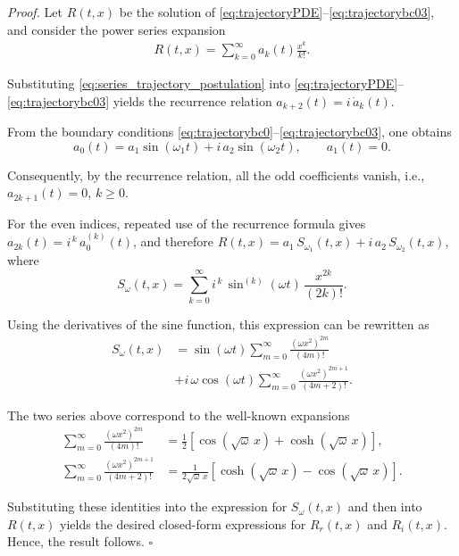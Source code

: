 \documentclass[letterpaper, 10 pt, conference]{ieeeconf}  %
\newenvironment{pf}
{\noindent\textit{Proof.}\hspace{1.2mm}}
{\hspace{\fill}$\square$}
\begin{document}
\begin{pf}
Let $R(t,x)$ be the solution of \eqref{eq:trajectoryPDE}--\eqref{eq:trajectorybc03}, and consider the power series expansion
\begin{align}
    R(t,x) = \sum_{k=0}^{\infty} a_{k}(t)\frac{x^{k}}{k!}.
    \label{eq:series_trajectory_postulation}
\end{align}

Substituting \eqref{eq:series_trajectory_postulation} into \eqref{eq:trajectoryPDE}--\eqref{eq:trajectorybc03} yields the recurrence relation $a_{k+2}(t) = i\,\dot{a}_{k}(t)$.

From the boundary conditions \eqref{eq:trajectorybc0}--\eqref{eq:trajectorybc03}, one obtains
\begin{equation*}
    a_{0}(t) = a_{1}\sin(\omega_{1}t) + i\,a_{2}\sin(\omega_{2}t),
    \qquad 
    a_{1}(t) = 0.
\end{equation*}

Consequently, by the recurrence relation, all the odd coefficients vanish, i.e., $a_{2k+1}(t) = 0$,  $k \ge 0$.

For the even indices, repeated use of the recurrence formula gives $a_{2k}(t) = i^{\,k}\,a_{0}^{(k)}(t)$, and therefore
$R(t,x) = a_{1}\,S_{\omega_{1}}(t,x) + i\,a_{2}\,S_{\omega_{2}}(t,x)$,
where
\begin{equation*}
    S_{\omega}(t,x) = \sum_{k=0}^{\infty} i^{\,k}\,\sin^{(k)}(\omega t)\,\frac{x^{2k}}{(2k)!}.
\end{equation*}


Using the derivatives of the sine function, this expression can be rewritten as
\begin{align*}
    S_{\omega}(t,x) &= \sin(\omega t)\sum_{m=0}^{\infty} \frac{(\omega x^{2})^{2m}}{(4m)!} \\
    & + i\,\omega\cos(\omega t)\sum_{m=0}^{\infty} \frac{(\omega x^{2})^{2m+1}}{(4m+2)!}.
\end{align*}

The two series above correspond to the well-known expansions
\begin{align*}
    \sum_{m=0}^{\infty}\frac{(\omega x^{2})^{2m}}{(4m)!}
    &= \tfrac{1}{2}\left[\cos(\sqrt{\omega}\,x) + \cosh(\sqrt{\omega}\,x)\right],\\
    \sum_{m=0}^{\infty}\frac{(\omega x^{2})^{2m+1}}{(4m+2)!}
    &= \tfrac{1}{2\sqrt{\omega}\,x}\left[\cosh(\sqrt{\omega}\,x) - \cos(\sqrt{\omega}\,x)\right].
\end{align*}

Substituting these identities into the expression for $S_{\omega}(t,x)$ and then into $R(t,x)$ yields the desired closed-form expressions for $R_{r}(t,x)$ and $R_{i}(t,x)$. Hence, the result follows.
\end{pf}
\end{document}
